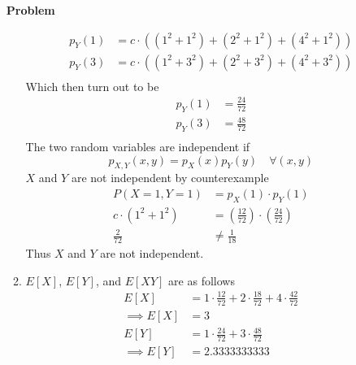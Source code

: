 \documentclass[12pt]{article}
\newenvironment{Ex}{\textbf{Problem}\vspace{.75em}\\}{}
\begin{document}
\begin{enumerate}
\begin{Ex}
\begin{solution}
\begin{enumerate}
\begin{equation}
            \label{eq:2d-marginal-y}
            \begin{aligned}
              p_Y(1) &= c\cdot((1^2+1^2) + (2^2+1^2) + (4^2+1^2))\\
              p_Y(3) &= c\cdot((1^2+3^2) + (2^2+3^2) + (4^2+3^2)) \\
            \end{aligned}
          \end{equation}
          Which then turn out to be
          \begin{equation}
            \label{eq:2d-marginal-y-values}
            \begin{aligned}
              p_Y(1) &= \frac{24}{72} \\
              p_Y(3) &= \frac{48}{72} \\
            \end{aligned}
          \end{equation}
          The two random variables are independent if 
          \begin{equation}
            \label{eq:2d-independent}
            p_{X,Y}(x,y) = p_X(x)p_Y(y) \quad \forall (x,y)
          \end{equation}
          $X$ and $Y$ are not independent by counterexample
          \begin{equation}
            \label{eq:2d-counterexample}
            \begin{aligned}
              P(X=1, Y=1) &= p_X(1) \cdot p_Y(1) \\
              c\cdot(1^2 + 1^2)&=
              \left(\frac{12}{72}\right)\cdot\left(\frac{24}{72}\right)
              \\ 
              \frac{2}{72} &\not= \frac{1}{18}
            \end{aligned}
          \end{equation}
          Thus $X$ and $Y$ are not independent.
        \item $E[X]$, $E[Y]$, and $E[XY]$ are as follows
          \begin{equation}
            \label{eq:2e-expectation-x-y-xy}
            \begin{aligned}
              E[X] &= 1\cdot\frac{12}{72} + 2\cdot\frac{18}{72} +
              4\cdot\frac{42}{72} \\
              \implies E[X] &= 3 \\
              E[Y] &= 1\cdot\frac{24}{72} + 3\cdot\frac{48}{72} \\
              \implies E[Y] &= 2.3333333333 \\

\end{aligned}
\end{equation}
\end{enumerate}
\end{solution}
\end{Ex}
\end{enumerate}
\end{document}
